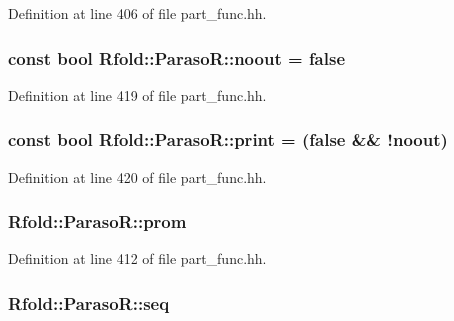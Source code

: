 Definition at line 406 of file part\+\_\+func.\+hh.

\hypertarget{class_rfold_1_1_paraso_r_af4875402eee0ce6bfd06e1cd35ea1c4a}{
\subsubsection[{noout}]{\setlength{\rightskip}{0pt plus 5cm}const bool Rfold\+::\+Paraso\+R\+::noout = false\hspace{0.3cm}{\ttfamily [static]}}}\label{class_rfold_1_1_paraso_r_af4875402eee0ce6bfd06e1cd35ea1c4a}


Definition at line 419 of file part\+\_\+func.\+hh.

\hypertarget{class_rfold_1_1_paraso_r_a11f8ab335a786811c32a9b430fcf4d2a}{
\subsubsection[{print}]{\setlength{\rightskip}{0pt plus 5cm}const bool Rfold\+::\+Paraso\+R\+::print = (false \&\& !{\bf noout})\hspace{0.3cm}{\ttfamily [static]}}}\label{class_rfold_1_1_paraso_r_a11f8ab335a786811c32a9b430fcf4d2a}


Definition at line 420 of file part\+\_\+func.\+hh.

\hypertarget{class_rfold_1_1_paraso_r_ad4b227950cd3ec1df3581d9c474777e5}{
\subsubsection[{prom}]{ Rfold\+::\+Paraso\+R\+::prom}}\label{class_rfold_1_1_paraso_r_ad4b227950cd3ec1df3581d9c474777e5}


Definition at line 412 of file part\+\_\+func.\+hh.

\hypertarget{class_rfold_1_1_paraso_r_a5f61516d848cce0e2a93b2d3e22f63ea}{
\subsubsection[{seq}]{ Rfold\+::\+Paraso\+R\+::seq}}\label{class_rfold_1_1_paraso_r_a5f61516d848cce0e2a93b2d3e22f63ea}


